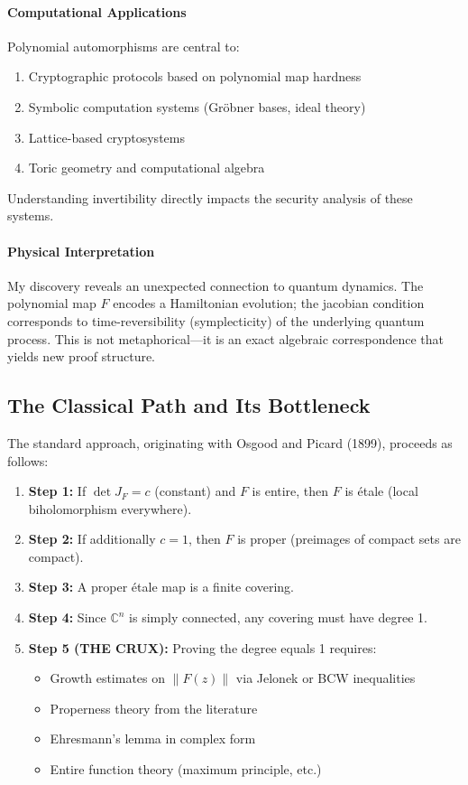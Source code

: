 \documentclass[11pt,a4paper]{article}
\theoremstyle{plain}
\theoremstyle{definition}
\newcommand{\CC}{\mathbb{C}}
\begin{document}
\paragraph{Computational Applications}

Polynomial automorphisms are central to:
\begin{enumerate}
\item Cryptographic protocols based on polynomial map hardness
\item Symbolic computation systems (Gröbner bases, ideal theory)
\item Lattice-based cryptosystems
\item Toric geometry and computational algebra
\end{enumerate}

Understanding invertibility directly impacts the security analysis of these systems.

\paragraph{Physical Interpretation}

My discovery reveals an unexpected connection to quantum dynamics. The polynomial map $F$ encodes a Hamiltonian evolution; the jacobian condition corresponds to time-reversibility (symplecticity) of the underlying quantum process. This is not metaphorical—it is an exact algebraic correspondence that yields new proof structure.

\subsection{The Classical Path and Its Bottleneck}
\label{subsec:classical-path}

The standard approach, originating with Osgood and Picard (1899), proceeds as follows:

\begin{enumerate}
\item \textbf{Step 1:} If $\det J_F = c$ (constant) and $F$ is entire, then $F$ is étale (local biholomorphism everywhere).
\item \textbf{Step 2:} If additionally $c = 1$, then $F$ is proper (preimages of compact sets are compact).
\item \textbf{Step 3:} A proper étale map is a finite covering.
\item \textbf{Step 4:} Since $\CC^n$ is simply connected, any covering must have degree 1.
\item \textbf{Step 5 (THE CRUX):} Proving the degree equals 1 requires:
  \begin{itemize}
  \item Growth estimates on $\|F(z)\|$ via Jelonek or BCW inequalities
  \item Properness theory from the literature
  \item Ehresmann's lemma in complex form
  \item Entire function theory (maximum principle, etc.)
  \end{itemize}
\end{enumerate}
\end{document}
